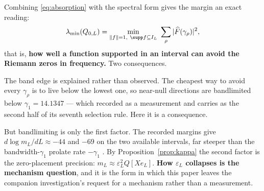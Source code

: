 Combining \eqref{eq:absorption} with the spectral form gives the margin an exact
reading:
\[
 \lambda_{\min}(Q_{0,L})
 =\min_{\lVert f\rVert=1,\ \supp f\subseteq I_L}\ \sum_\rho|\widehat F(\gamma_\rho)|^2 ,
\]
that is, \textbf{how well a function supported in an interval can avoid the
Riemann zeros in frequency.} Two consequences.

The band edge is explained rather than observed. The cheapest way to avoid every
$\gamma_\rho$ is to live below the lowest one, so near-null directions are
bandlimited below $\gamma_1=14.1347$ --- which \cite{Bottleneck} recorded as a
measurement and \cite{Selection} carries as the second half of its seventh
selection rule. Here it is a consequence.

But bandlimiting is only the first factor. The recorded margins give
$d\log m_L/dL\approx-44$ and $-69$ on the two available intervals, far steeper
than the bandwidth-$\gamma_1$ prolate rate $-\gamma_1$ \cite{SlepianPollak}. By
Proposition~\ref{prop:kappa} the second factor is the zero-placement precision:
$m_L\approx\varepsilon_L^2Q[Xe_L]$. \textbf{How $\varepsilon_L$ collapses is the
mechanism question}, and it is the form in which this paper leaves the companion
investigation's request for a mechanism rather than a measurement.
